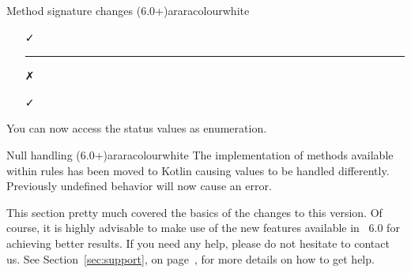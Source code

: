 \begin{messagebox}{Method signature changes (6.0+)}{araracolour}{\icinfo}{white}
\begin{itemize}
\hspace{2cm}\textcolor{teal}{\faArrowDown}

\item[\textcolor{okcolour}{\faCheck}]

\vspace{1em}

{\color{araracolour}\hrule}

\item[\textcolor{warningcolour}{\faClose}]

\vspace{.5em}

\hspace{2cm}\textcolor{teal}{\faArrowDown}

\item[\textcolor{okcolour}{\faCheck}]
\end{itemize}

You can now access the status values as enumeration.
\end{messagebox}

\begin{messagebox}{Null handling (6.0+)}{araracolour}{\icinfo}{white}
The implementation of methods available within rules has been moved to Kotlin causing  values to be handled differently. Previously undefined behavior will now cause an error.
\end{messagebox}

This section pretty much covered the basics of the changes to this version. Of course, it is highly advisable to make use of the new features available in \arara\ 6.0 for achieving better results. If you need any help, please do not hesitate to contact us. See Section~\ref{sec:support}, on page~\pageref{sec:support}, for more details on how to get help.
